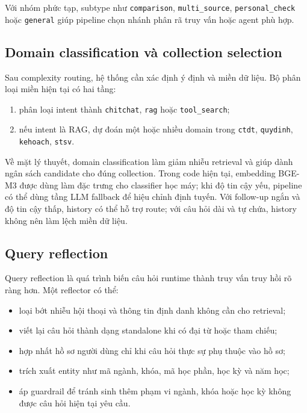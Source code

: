 \documentclass[../DoAn.tex]{subfiles}
\begin{document}
Với nhóm phức tạp, subtype như \texttt{comparison}, \texttt{multi\_source},
\texttt{personal\_check} hoặc \texttt{general} giúp pipeline chọn nhánh phân rã
truy vấn hoặc agent phù hợp.

\subsection{Domain classification và collection selection}

Sau complexity routing, hệ thống cần xác định ý định và miền dữ liệu. Bộ phân
loại miền hiện tại có hai tầng:

\begin{enumerate}
    \item phân loại intent thành \texttt{chitchat}, \texttt{rag} hoặc
    \texttt{tool\_search};
    \item nếu intent là RAG, dự đoán một hoặc nhiều domain trong
    \texttt{ctdt}, \texttt{quydinh}, \texttt{kehoach}, \texttt{stsv}.
\end{enumerate}

Về mặt lý thuyết, domain classification làm giảm nhiễu retrieval và giúp dành
ngân sách candidate cho đúng collection. Trong code hiện tại, embedding BGE-M3
được dùng làm đặc trưng cho classifier học máy; khi độ tin cậy yếu, pipeline có
thể dùng tầng LLM fallback để hiệu chỉnh định tuyến. Với follow-up ngắn và độ tin
cậy thấp, history có thể hỗ trợ route; với câu hỏi dài và tự chứa, history không
nên làm lệch miền dữ liệu.

\subsection{Query reflection}

Query reflection là quá trình biến câu hỏi runtime thành truy vấn truy hồi rõ
ràng hơn. Một reflector có thể:

\begin{itemize}
    \item loại bớt nhiễu hội thoại và thông tin định danh không cần cho retrieval;
    \item viết lại câu hỏi thành dạng standalone khi có đại từ hoặc tham chiếu;
    \item hợp nhất hồ sơ người dùng chỉ khi câu hỏi thực sự phụ thuộc vào hồ sơ;
    \item trích xuất entity như mã ngành, khóa, mã học phần, học kỳ và năm học;
    \item áp guardrail để tránh sinh thêm phạm vi ngành, khóa hoặc học kỳ không
    được câu hỏi hiện tại yêu cầu.
\end{itemize}
\end{document}
